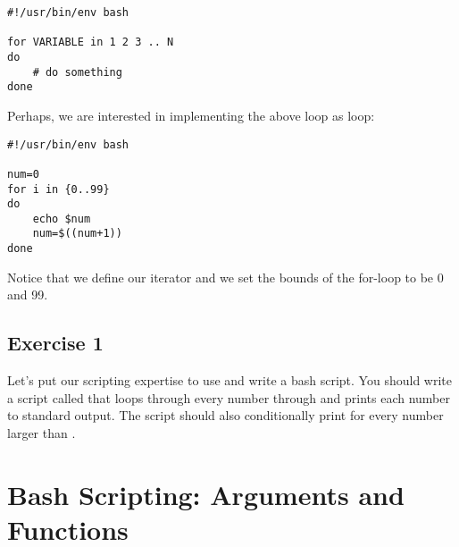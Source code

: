 \documentclass{article}
\begin{document}
\begin{lstlisting}[style=Python]
#!/usr/bin/env bash

for VARIABLE in 1 2 3 .. N
do
	# do something
done

\end{lstlisting}

Perhaps, we are interested in implementing the above  loop as  loop: 
\begin{lstlisting}[style=Python]
#!/usr/bin/env bash

num=0
for i in {0..99}
do
	echo $num
	num=$((num+1))
done

\end{lstlisting}
Notice that we define our iterator  and we set the bounds of the for-loop to be 0 and 99. 
\subsection{Exercise 1}
Let's put our scripting expertise to use and write a bash script. You should write a script called  that loops through every number  through  and prints each number to standard output. The script should also conditionally print  for every number larger than . 

\section{Bash Scripting: Arguments and Functions}
\end{document}
